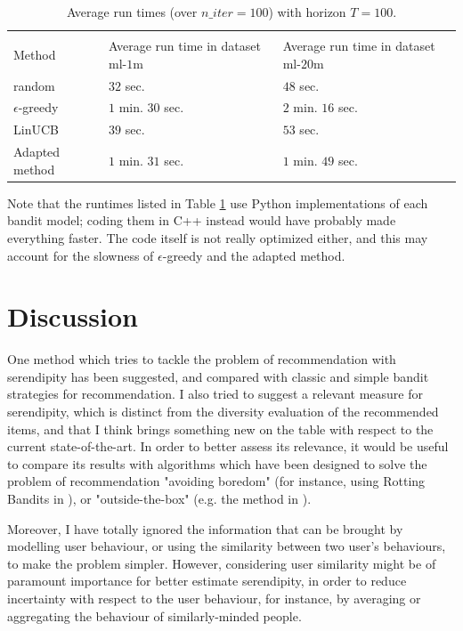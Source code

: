 \documentclass{article}
\begin{document}
\begin{table}[H]
  \label{runtimes}
  \centering
  \begin{tabular}{lll}
    \multicolumn{3}{c}{}                   \\
    \cmidrule(r){1-3}
    Method     & Average run time in dataset $\text{ml-1m}$ &  Average run time in dataset $\text{ml-20m}$  \\
    \midrule
    random & $32$ sec. & $48$ sec.  \\
    $\epsilon$-greedy & $1$ min. $30$ sec. & $2$ min. $16$ sec.\\
    LinUCB     & $39$ sec. & $53$ sec.\\
    Adapted method     & $1$ min. $31$ sec. & $1$ min. $49$ sec. \\
    \bottomrule
  \end{tabular}
  \caption{Average run times (over $n\_iter=100$) with horizon $T=100$.}
\end{table}

Note that the runtimes listed in Table \ref{runtimes} use Python implementations of each bandit model; coding them in C++ instead would have probably made everything faster. The code itself is not really optimized either, and this may account for the slowness of $\epsilon$-greedy and the adapted method.


\section{Discussion}

One method which tries to tackle the problem of recommendation with serendipity has been suggested, and compared with classic and simple bandit strategies for recommendation. I also tried to suggest a relevant measure for serendipity, which is distinct from the diversity evaluation of the recommended items, and that I think brings something new on the table with respect to the current state-of-the-art. In order to better assess its relevance, it would be useful to compare its results with algorithms which have been designed to solve the problem of recommendation "avoiding boredom" (for instance, using Rotting Bandits in \cite{seznec2018rotting}), or "outside-the-box" (e.g. the method in \cite{abbassi2009getting}).

Moreover, I have totally ignored the information that can be brought by modelling user behaviour, or using the similarity between two user's behaviours, to make the problem simpler. However, considering user similarity might be of paramount importance for better estimate serendipity, in order to reduce incertainty with respect to the user behaviour, for instance, by averaging or aggregating the behaviour of similarly-minded people.
\end{document}
